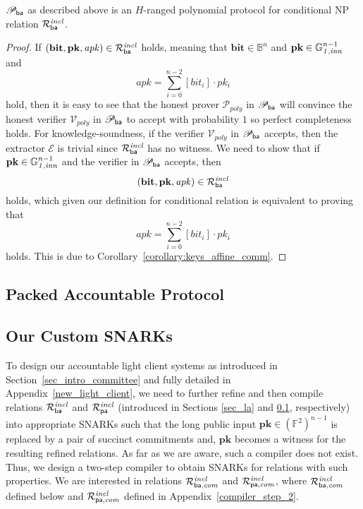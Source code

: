 \begin{lemma} 
\label{le:ba}
$\mathscr{P}_{\mathsf{ba}}$ as described above is an $H$-ranged polynomial 
protocol for conditional NP relation $\mathcal{R}^{\mathit{incl}}_{\mathsf{ba}}$.
\end{lemma}
\vspace{-0.15in}

\begin{proof}
If $(\mathbf{bit},\mathbf{pk}, \mathit{apk}) \in \mathcal{R}^{\mathit{incl}}_{\mathsf{ba}}$ holds, 
meaning that $\mathbf{bit} \in \mathbb{B}^n$ and $\mathbf{pk} \in \mathbb{G}_{\mathit{1,inn}}^{n-1}$ and $$\mathit{apk} = \sum_{i=0}^{n-2} [\mathit{bit_i}] \cdot \mathit{pk_i}$$ hold, 
then it is easy to see that the honest prover $\mathcal{P}_{poly}$ in $\mathscr{P}_{\mathsf{ba}}$ will convince the honest verifier $\mathcal{V}_{poly}$ in 
$\mathscr{P}_{\mathsf{ba}}$ to accept with probability $1$ so perfect completeness holds. 
For knowledge-soundness, if the verifier $\mathcal{V}_{poly}$ in $\mathscr{P}_{\mathsf{ba}}$ accepts, 
then the extractor $\mathcal{E}$ is trivial since $\mathcal{R}^{\mathit{incl}}_{\mathsf{ba}}$ has no witness.  
We need to show that if $\mathbf{pk} \in \mathbb{G}_{\mathit{1,inn}}^{n-1}$ and the verifier in $\mathscr{P}_{\mathsf{ba}}$ accepts, 
then $$(\mathbf{bit},\mathbf{pk}, \mathit{apk}) \in \mathcal{R}^{\mathit{incl}}_{\mathsf{ba}}$$ holds, which given our definition for conditional relation is 
equivalent to proving that $$\mathit{apk} = \sum_{i=0}^{n-2} [\mathit{bit_i}] \cdot \mathit{pk_i}$$ holds. This is due to 
Corollary~\ref{corollary:keys_affine_comm}. \end{proof}
\vspace{-0.15in}

\subsection{Packed Accountable Protocol}
\label{sec_a}


\subsection{Our Custom SNARKs}
\label{sec_custom_snarks}
To design our accountable light client systems as introduced in Section~\ref{sec_intro_committee} and fully detailed in Appendix~\ref{new_light_client}, 
we need to further refine and then compile relations $\mathcal{R}^{\mathit{incl}}_{\mathsf{ba}}$ and $\mathcal{R}^{\mathit{incl}}_{\mathsf{pa}}$ (introduced in Sections \ref{sec_la} and \ref{sec_a}, respectively) into appropriate 
SNARKs such that the long public input $\mathbf{pk} \in ({\mathbb{F}^2})^{n-1}$ is replaced by a 
pair of succinct commitments and, $\mathbf{pk}$ becomes a witness for the resulting refined relations. As far as we are aware, such a compiler does not exist. 
Thus, we design a two-step compiler to obtain SNARKs for relations with such properties. We are interested in relations $\mathcal{R}^{\mathit{incl}}_{\mathsf{ba},\mathit{com}}$ and $\mathcal{R}^{\mathit{incl}}_{\mathsf{pa},\mathit{com}}$, where 
$\mathcal{R}^{\mathit{incl}}_{\mathsf{ba},\mathit{com}}$ defined below and $\mathcal{R}^{\mathit{incl}}_{\mathsf{pa},\mathit{com}}$ defined in Appendix~\ref{compiler_step_2}.
 

